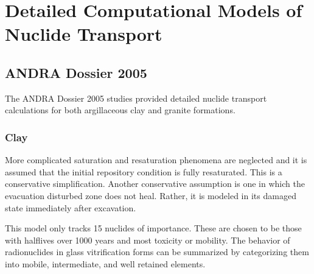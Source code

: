 \section{Detailed Computational Models of Nuclide Transport}
\label{sec:detailed_nuclide}

\subsection{ANDRA Dossier 2005}
The ANDRA Dossier 2005 studies provided detailed nuclide transport 
calculations for both argillaceous clay and granite formations.

\subsubsection{Clay}
More complicated saturation and resaturation phenomena are neglected 
and it is assumed that the initial repository condition is fully 
resaturated. This is a conservative simplification. Another 
conservative assumption is one in which the evacuation disturbed zone 
does not heal. Rather, it is modeled in its damaged state immediately 
after excavation. 

This model only tracks 15 nuclides of importance.  
These are chosen to be those with halflives over 1000 years and most 
toxicity or mobility. \cite{andra_argile:_2005} %
The behavior of radionuclides in glass vitrification forms can be 
summarized by categorizing them into mobile, intermediate, and well 
retained elements. %






